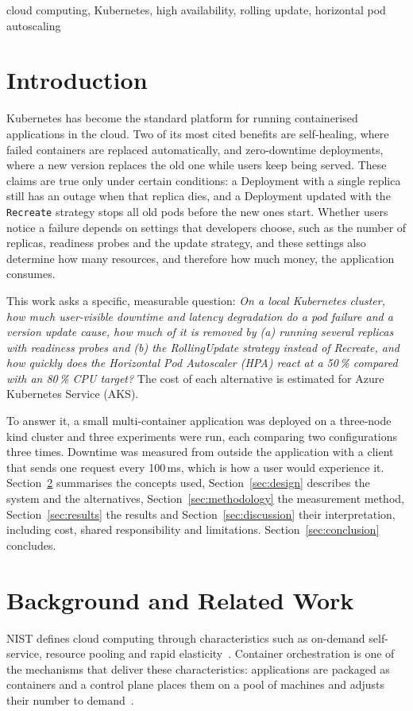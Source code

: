 \documentclass[conference,a4paper]{IEEEtran}
\begin{document}
\begin{IEEEkeywords}
cloud computing, Kubernetes, high availability, rolling update, horizontal pod autoscaling
\end{IEEEkeywords}

\section{Introduction}
\label{sec:introduction}
Kubernetes has become the standard platform for running containerised applications in the cloud. Two of its most cited benefits are self-healing, where failed containers are replaced automatically, and zero-downtime deployments, where a new version replaces the old one while users keep being served. These claims are true only under certain conditions: a Deployment with a single replica still has an outage when that replica dies, and a Deployment updated with the \texttt{Recreate} strategy stops all old pods before the new ones start. Whether users notice a failure depends on settings that developers choose, such as the number of replicas, readiness probes and the update strategy, and these settings also determine how many resources, and therefore how much money, the application consumes.

This work asks a specific, measurable question: \emph{On a local Kubernetes cluster, how much user-visible downtime and latency degradation do a pod failure and a version update cause, how much of it is removed by (a) running several replicas with readiness probes and (b) the RollingUpdate strategy instead of Recreate, and how quickly does the Horizontal Pod Autoscaler (HPA) react at a 50\,\% compared with an 80\,\% CPU target?} The cost of each alternative is estimated for Azure Kubernetes Service (AKS).

To answer it, a small multi-container application was deployed on a three-node kind cluster and three experiments were run, each comparing two configurations three times. Downtime was measured from outside the application with a client that sends one request every 100\,ms, which is how a user would experience it. Section~\ref{sec:related_work} summarises the concepts used, Section~\ref{sec:design} describes the system and the alternatives, Section~\ref{sec:methodology} the measurement method, Section~\ref{sec:results} the results and Section~\ref{sec:discussion} their interpretation, including cost, shared responsibility and limitations. Section~\ref{sec:conclusion} concludes.

\section{Background and Related Work}
\label{sec:related_work}
NIST defines cloud computing through characteristics such as on-demand self-service, resource pooling and rapid elasticity~\cite{nist}. Container orchestration is one of the mechanisms that deliver these characteristics: applications are packaged as containers and a control plane places them on a pool of machines and adjusts their number to demand~\cite{west}.
\end{document}
